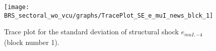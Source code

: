 \begin{figure}[H]
\centering
  \texttt{[image: BRS\_sectoral\_wo\_vcu/graphs/TracePlot\_SE\_e\_muI\_news\_blck\_1]}\\
    \caption{Trace plot for the standard deviation of structural shock ${e_{muI,-4}}$ (block number 1).}
\end{figure}
